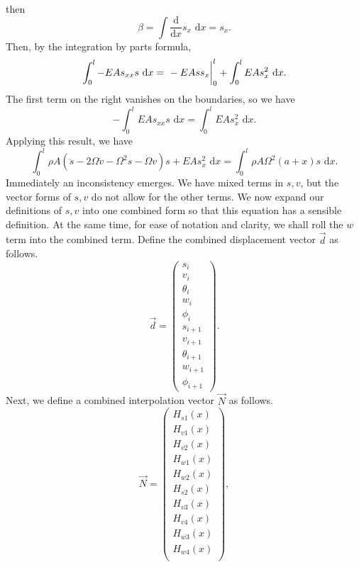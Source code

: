 then
\begin{equation}
\beta = \int \frac{\text{d}}{\text{d}x}s_x\text{ d}x = s_x.
\end{equation}
Then, by the integration by parts formula,
\begin{equation}
\int_0^l -EAs_{xx}s\text{ d}x = \left.\vphantom{\int}-EAss_x\right|_0^l+\int_0^l EAs_x^2\text{ d}x.
\label{eq:s.disc.int.by.parts}
\end{equation}
The first term on the right vanishes on the boundaries, so we have
\begin{equation}
-\int_0^l EAs_{xx}s\text{ d}x = \int_0^l EAs_x^2\text{ d}x.
\end{equation}
Applying this result, we have
\begin{equation}
\int_0^l \rho A(\ddot s-2\Omega\dot v-\Omega^2s-\dot\Omega v)s+EAs_x^2 \text{ d}x = \int_0^l \rho A\Omega^2(a+x)s\text{ d}x.
\label{eq:s_displacement_integral_nonsense}
\end{equation}
Immediately an inconsistency emerges. We have mixed terms in $s,v$, but the vector forms of $s,v$ do not allow for the other terms. We now expand our definitions of $s,v$ into one combined form so that this equation has a sensible definition. At the same time, for ease of notation and clarity, we shall roll the $w$ term into the combined term. Define the combined displacement vector $\vec d$ as follows.
\begin{equation}
\vec d = 
\begin{pmatrix}
s_i \\ 
v_i \\ 
\theta_i \\
w_i \\
\phi_i \\
s_{i+1} \\
v_{i+1} \\
\theta_{i+1} \\
w_{i+1} \\
\phi_{i+1}
\end{pmatrix}.
\end{equation}
Next, we define a combined interpolation vector $\vec{N}$ as follows.
\begin{equation}
\vec{N} = 
\begin{pmatrix}
H_{s1}(x) \\
H_{v1}(x) \\
H_{v2}(x) \\
H_{w1}(x) \\
H_{w2}(x) \\
H_{s2}(x) \\
H_{v3}(x) \\
H_{v4}(x) \\
H_{w3}(x) \\
H_{w4}(x) \\
\end{pmatrix},
\end{equation}
